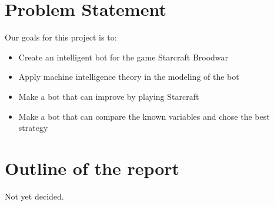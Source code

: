 \section{Problem Statement}
	Our goals for this project is to:
	\begin{itemize}
		\item Create an intelligent bot for the game Starcraft Broodwar
		\item Apply machine intelligence theory in the modeling of the bot
		\item Make a bot that can improve by playing Starcraft
		\item Make a bot that can compare the known variables and chose the best strategy
	\end{itemize}

\section{Outline of the report}
	Not yet decided.